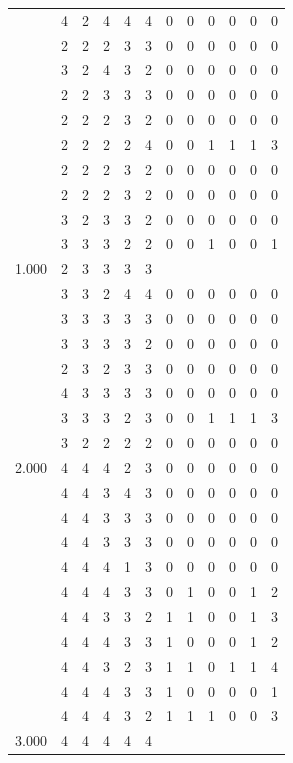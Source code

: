 \documentclass[]{book}
\theoremstyle{definition}
\theoremstyle{definition}
\theoremstyle{definition}
\theoremstyle{remark}
\begin{document}
\begin{table}
{\begin{tabular}[t]{rrrrrrrrrrrr}
 & 4 & 2 & 4 & 4 & 4 & 0 & 0 & 0 & 0 & 0 & 0\\
 & 2 & 2 & 2 & 3 & 3 & 0 & 0 & 0 & 0 & 0 & 0\\
 & 3 & 2 & 4 & 3 & 2 & 0 & 0 & 0 & 0 & 0 & 0\\
 & 2 & 2 & 3 & 3 & 3 & 0 & 0 & 0 & 0 & 0 & 0\\
 & 2 & 2 & 2 & 3 & 2 & 0 & 0 & 0 & 0 & 0 & 0\\
 & 2 & 2 & 2 & 2 & 4 & 0 & 0 & 1 & 1 & 1 & 3\\
 & 2 & 2 & 2 & 3 & 2 & 0 & 0 & 0 & 0 & 0 & 0\\
 & 2 & 2 & 2 & 3 & 2 & 0 & 0 & 0 & 0 & 0 & 0\\
 & 3 & 2 & 3 & 3 & 2 & 0 & 0 & 0 & 0 & 0 & 0\\
 & 3 & 3 & 3 & 2 & 2 & 0 & 0 & 1 & 0 & 0 & 1\\
1.000 & 2 & 3 & 3 & 3 & 3 &  &  &  &  &  & \\
 & 3 & 3 & 2 & 4 & 4 & 0 & 0 & 0 & 0 & 0 & 0\\
 & 3 & 3 & 3 & 3 & 3 & 0 & 0 & 0 & 0 & 0 & 0\\
 & 3 & 3 & 3 & 3 & 2 & 0 & 0 & 0 & 0 & 0 & 0\\
 & 2 & 3 & 2 & 3 & 3 & 0 & 0 & 0 & 0 & 0 & 0\\
 & 4 & 3 & 3 & 3 & 3 & 0 & 0 & 0 & 0 & 0 & 0\\
 & 3 & 3 & 3 & 2 & 3 & 0 & 0 & 1 & 1 & 1 & 3\\
 & 3 & 2 & 2 & 2 & 2 & 0 & 0 & 0 & 0 & 0 & 0\\
2.000 & 4 & 4 & 4 & 2 & 3 & 0 & 0 & 0 & 0 & 0 & 0\\
 & 4 & 4 & 3 & 4 & 3 & 0 & 0 & 0 & 0 & 0 & 0\\
 & 4 & 4 & 3 & 3 & 3 & 0 & 0 & 0 & 0 & 0 & 0\\
 & 4 & 4 & 3 & 3 & 3 & 0 & 0 & 0 & 0 & 0 & 0\\
 & 4 & 4 & 4 & 1 & 3 & 0 & 0 & 0 & 0 & 0 & 0\\
 & 4 & 4 & 4 & 3 & 3 & 0 & 1 & 0 & 0 & 1 & 2\\
 & 4 & 4 & 3 & 3 & 2 & 1 & 1 & 0 & 0 & 1 & 3\\
 & 4 & 4 & 4 & 3 & 3 & 1 & 0 & 0 & 0 & 1 & 2\\
 & 4 & 4 & 3 & 2 & 3 & 1 & 1 & 0 & 1 & 1 & 4\\
 & 4 & 4 & 4 & 3 & 3 & 1 & 0 & 0 & 0 & 0 & 1\\
 & 4 & 4 & 4 & 3 & 2 & 1 & 1 & 1 & 0 & 0 & 3\\
3.000 & 4 & 4 & 4 & 4 & 4 &  &  &  &  &  & \\

\end{tabular}}
\end{table}
\end{document}
